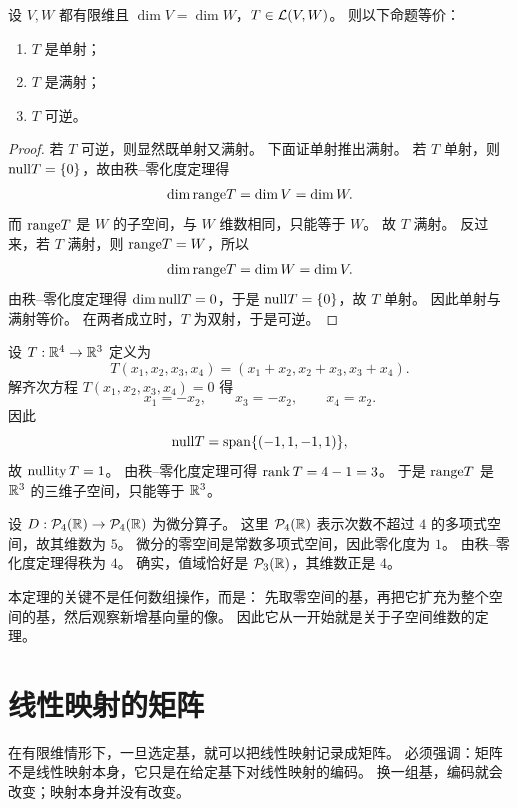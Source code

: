 \begin{corollary} 设 $V,W$ 都有限维且 $\dim V=\dim W$，$T\in\mathcal{L}(V,W)$。 则以下命题等价：
\begin{enumerate}[label=(\arabic*)] \item $T$ 是单射； \item $T$ 是满射； \item $T$ 可逆。
\end{enumerate} \end{corollary}

\begin{proof} 若 $T$ 可逆，则显然既单射又满射。 下面证单射推出满射。 若 $T$ 单射，则 $\mathrm{null} T=\{0\}$，故由秩--零化度定理得 \[
\dim \mathrm{range} T=\dim V=\dim W. \] 而 $\mathrm{range} T$ 是 $W$ 的子空间，与 $W$ 维数相同，只能等于 $W$。 故 $T$ 满射。
反过来，若 $T$ 满射，则 $\mathrm{range} T=W$，所以 \[ \dim \mathrm{range} T=\dim W=\dim V. \] 由秩--零化度定理得 $\dim \mathrm{null}
T=0$，于是 $\mathrm{null} T=\{0\}$，故 $T$ 单射。 因此单射与满射等价。 在两者成立时，$T$ 为双射，于是可逆。 \end{proof}

\begin{example} 设 $T:\mathbb{R}^4\to\mathbb{R}^3$ 定义为 \[ T(x_1,x_2,x_3,x_4)=(x_1+x_2,x_2+x_3,x_3+x_4).
\] 解齐次方程 $T(x_1,x_2,x_3,x_4)=0$ 得 \[ x_1=-x_2,\qquad x_3=-x_2,\qquad x_4=x_2. \] 因此 \[
\mathrm{null} T=\operatorname{span}\{(-1,1,-1,1)\}, \] 故 $\operatorname{nullity} T=1$。 由秩--零化度定理可得 $\operatorname{rank} T=4-1=3$。 于是 $\mathrm{range}
T$ 是 $\mathbb{R}^3$ 的三维子空间，只能等于 $\mathbb{R}^3$。 \end{example}

\begin{example} 设 $D:\mathcal{P}_4(\mathbb{R})\to\mathcal{P}_4(\mathbb{R})$ 为微分算子。 这里 $\mathcal{P}_4(\mathbb{R})$ 表示次数不超过 $4$
的多项式空间，故其维数为 $5$。 微分的零空间是常数多项式空间，因此零化度为 $1$。 由秩--零化度定理得秩为 $4$。 确实，值域恰好是
$\mathcal{P}_3(\mathbb{R})$，其维数正是 $4$。 \end{example}

\begin{remark} 本定理的关键不是任何数组操作，而是： 先取零空间的基，再把它扩充为整个空间的基，然后观察新增基向量的像。 因此它从一开始就是关于子空间维数的定理。
\end{remark}

\section{线性映射的矩阵}

在有限维情形下，一旦选定基，就可以把线性映射记录成矩阵。 必须强调：矩阵不是线性映射本身，它只是在给定基下对线性映射的编码。 换一组基，编码就会改变；映射本身并没有改变。

